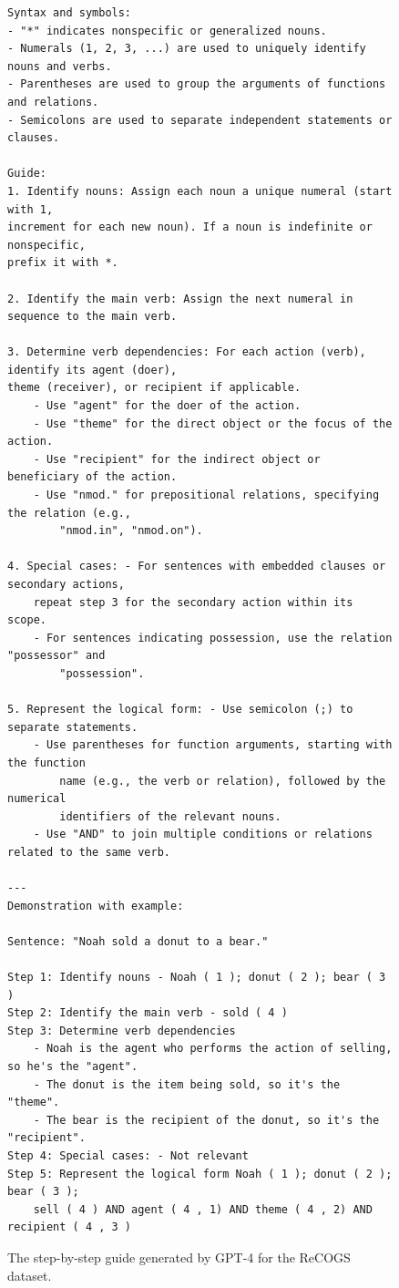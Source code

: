 \documentclass[11pt]{article}
\begin{document}
    \begin{figure}
        \small
        \begin{verbatim}
Syntax and symbols:
- "*" indicates nonspecific or generalized nouns.
- Numerals (1, 2, 3, ...) are used to uniquely identify nouns and verbs.
- Parentheses are used to group the arguments of functions and relations.
- Semicolons are used to separate independent statements or clauses.

Guide:
1. Identify nouns: Assign each noun a unique numeral (start with 1,
increment for each new noun). If a noun is indefinite or nonspecific,
prefix it with *.

2. Identify the main verb: Assign the next numeral in sequence to the main verb.

3. Determine verb dependencies: For each action (verb), identify its agent (doer),
theme (receiver), or recipient if applicable.
    - Use "agent" for the doer of the action.
    - Use "theme" for the direct object or the focus of the action.
    - Use "recipient" for the indirect object or beneficiary of the action.
    - Use "nmod." for prepositional relations, specifying the relation (e.g.,
        "nmod.in", "nmod.on").

4. Special cases: - For sentences with embedded clauses or secondary actions,
    repeat step 3 for the secondary action within its scope.
    - For sentences indicating possession, use the relation "possessor" and
        "possession".

5. Represent the logical form: - Use semicolon (;) to separate statements.
    - Use parentheses for function arguments, starting with the function
        name (e.g., the verb or relation), followed by the numerical
        identifiers of the relevant nouns.
    - Use "AND" to join multiple conditions or relations related to the same verb.

---
Demonstration with example:

Sentence: "Noah sold a donut to a bear."

Step 1: Identify nouns - Noah ( 1 ); donut ( 2 ); bear ( 3 )
Step 2: Identify the main verb - sold ( 4 )
Step 3: Determine verb dependencies
    - Noah is the agent who performs the action of selling, so he's the "agent".
    - The donut is the item being sold, so it's the "theme".
    - The bear is the recipient of the donut, so it's the "recipient".
Step 4: Special cases: - Not relevant
Step 5: Represent the logical form Noah ( 1 ); donut ( 2 ); bear ( 3 );
    sell ( 4 ) AND agent ( 4 , 1) AND theme ( 4 , 2) AND recipient ( 4 , 3 )
        \end{verbatim}
        \caption{The step-by-step guide generated by GPT-4 for the ReCOGS dataset.}
        \label{fig:gpt4_recogs_guide}
    \end{figure}
\end{document}
